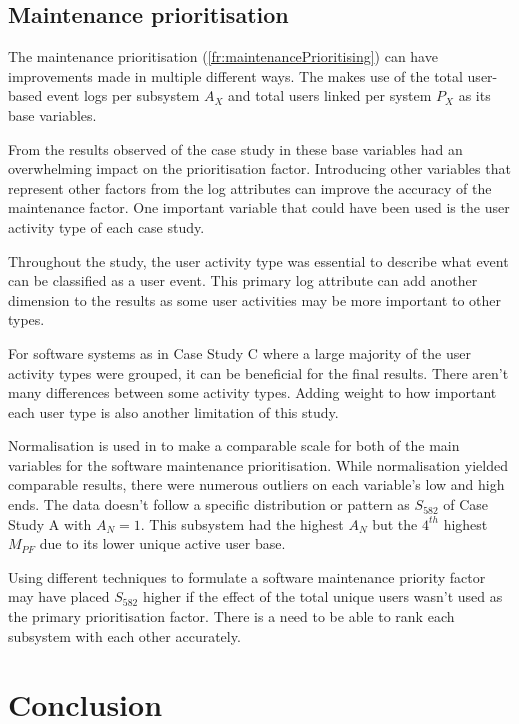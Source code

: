 \subsection{Maintenance prioritisation}
The maintenance prioritisation (\ref{fr:maintenancePrioritising}) can have improvements made in
multiple different ways. The
 makes use
of the total user-based event logs per subsystem $A_X$ and total users linked per system $P_X$ as
its base variables.\par From the results observed of the case study in 
these base variables had an overwhelming impact on the prioritisation factor. Introducing other
variables that represent other factors from the log attributes can improve the accuracy of the
maintenance factor. One important variable that could have been used is the user activity type of
each case study.\par Throughout the study, the user activity type was essential to describe what
event can be classified as a user event. This primary log attribute can add another dimension to the
results as some user activities may be more important to other types. \par For software systems as
in Case Study C where a large majority of the user activity types were grouped, it can be beneficial
for the final results. There aren't many differences between some activity types. Adding weight to
how important each user type is also another limitation of this study.\par Normalisation is used in
 to make a
comparable scale for both of the main variables for the software maintenance prioritisation. While
normalisation yielded comparable results, there were numerous outliers on each variable's low and
high ends. The data doesn't follow a specific distribution or pattern as $S_{582}$ of Case Study A
with $A_N=1$. This subsystem had the highest $A_N$ but the $4^{th}$ highest $M_{PF}$ due to
its lower unique active user base.\par Using different techniques to formulate a software
maintenance priority factor may have placed $S_{582}$ higher if the effect of the total unique users
wasn't used as the primary prioritisation factor. There is a need to be able to rank each subsystem
with each other accurately.

\section{Conclusion}

